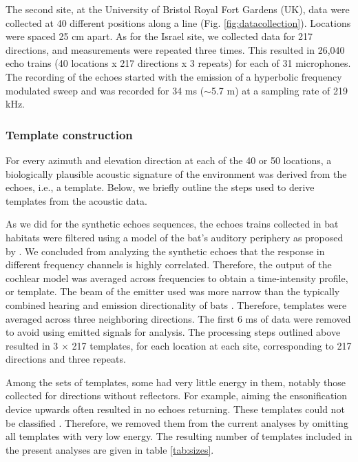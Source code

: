 \documentclass[preprint,5p]{elsarticle}
\begin{document}
The second site, at the University of Bristol Royal Fort Gardens (UK), data were collected at 40 different positions along a line (Fig. \ref{fig:datacollection}). Locations were spaced 25 cm apart. As for the Israel site, we collected data for 217 directions, and measurements were repeated three times. This resulted in 26,040 echo trains (40 locations x 217 directions x 3 repeats) for each of 31 microphones. The recording of the echoes started with the emission of a hyperbolic frequency modulated sweep and was recorded for 34 ms ($\sim$5.7 m) at a sampling rate of 219 kHz. 

\subsubsection{Template construction}

For every azimuth and elevation direction at each of the  40 or 50 locations, a biologically plausible acoustic signature of the environment was derived from the echoes, i.e., a template. Below, we briefly outline the steps used to derive templates from the acoustic data.

As we did for the synthetic echoes sequences, the echoes trains collected in bat habitats were filtered using a model of the bat's auditory periphery as proposed by \citet{Wiegrebe2008}. We concluded from analyzing the synthetic echoes that the response in different frequency channels is highly correlated. Therefore, the output of the cochlear model was averaged across frequencies to obtain a time-intensity profile, or template. The beam of the emitter used was more narrow than the typically combined hearing and emission directionality of bats \citep{Vanderelst2010a,Reijniers2010,Jakobsen2012}. Therefore, templates were averaged across three neighboring directions. The first 6 ms of data were removed to avoid using emitted signals for analysis. The processing steps outlined above resulted in 3 $\times$ 217 templates, for each location at each site, corresponding to 217 directions and three repeats.

Among the sets of templates, some had very little energy in them, notably those collected for directions without reflectors. For example, aiming the ensonification device upwards often resulted in no echoes returning. These templates could not be classified \citep{Vanderelst2016}. Therefore, we removed them from the current analyses by omitting all templates with very low energy. The resulting number of templates included in the present analyses are given in table \ref{tab:sizes}.
\end{document}
